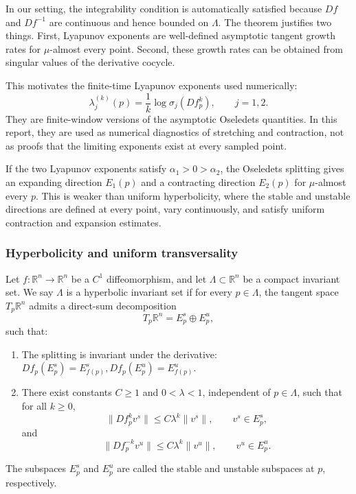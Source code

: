 In our setting, the integrability condition is automatically satisfied
because \(Df\) and \(Df^{-1}\) are continuous and hence bounded on \(\Lambda\).
The theorem justifies two things. First, Lyapunov exponents are well-defined
asymptotic tangent growth rates for \(\mu\)-almost every point. Second, these
growth rates can be obtained from singular values of the derivative cocycle.

This motivates the finite-time Lyapunov exponents used numerically:
\[
\lambda_j^{(k)}(p)
=
\frac1k\log\sigma_j(Df_p^k),
\qquad j=1,2.
\]
They are finite-window versions of the asymptotic Oseledets quantities. In this
report, they are used as numerical diagnostics of stretching and contraction, not
as proofs that the limiting exponents exist at every sampled point.

\begin{remark}
If the two Lyapunov exponents satisfy \(\alpha_1>0>\alpha_2\), the Oseledets
splitting gives an expanding direction \(E_1(p)\) and a contracting direction
\(E_2(p)\) for \(\mu\)-almost every \(p\). This is weaker than uniform
hyperbolicity, where the stable and unstable directions are defined at every point,
vary continuously, and satisfy uniform contraction and expansion estimates.
\end{remark}



\subsubsection{Hyperbolicity and uniform transversality}

\begin{definition}
Let \(f:\mathbb R^n\to\mathbb R^n\) be a \(C^1\) diffeomorphism, and let
\(\Lambda\subset \mathbb R^n\) be a compact invariant set. We say \(\Lambda\) is a hyperbolic invariant set if for every \(p\in\Lambda\),
the tangent space \(T_p\mathbb R^n\) admits a direct-sum decomposition
\[
T_p\mathbb R^n
=
E_p^s\oplus E_p^u,
\]
such that:

\begin{enumerate}[label=(\arabic*)]
    \item The splitting is invariant under the derivative:
    \(
    Df_p(E_p^s)=E_{f(p)}^s,
    Df_p(E_p^u)=E_{f(p)}^u.
    \)

    \item There exist constants \(C\geq 1\) and \(0<\lambda<1\), independent of
    \(p\in\Lambda\), such that for all \(k\geq 0\),
    \[
    \|Df_p^k v^s\|
    \leq
    C\lambda^k\|v^s\|,
    \qquad
    v^s\in E_p^s,
    \]
    and
    \[
    \|Df_p^{-k} v^u\|
    \leq
    C\lambda^k\|v^u\|,
    \qquad
    v^u\in E_p^u.
    \]
\end{enumerate}

The subspaces \(E_p^s\) and \(E_p^u\) are called the stable and unstable
subspaces at \(p\), respectively.
\end{definition}

